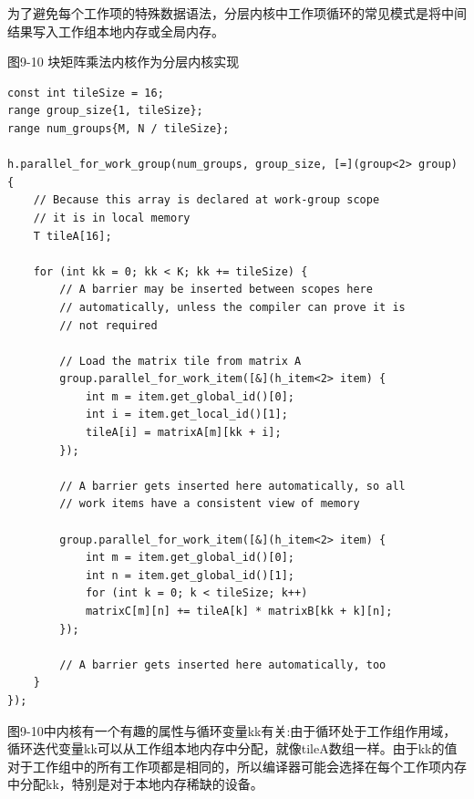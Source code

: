 为了避免每个工作项的特殊数据语法，分层内核中工作项循环的常见模式是将中间结果写入工作组本地内存或全局内存。\par

\hspace*{\fill} \par %
图9-10 块矩阵乘法内核作为分层内核实现
\begin{lstlisting}[caption={}]
const int tileSize = 16;
range group_size{1, tileSize};
range num_groups{M, N / tileSize};

h.parallel_for_work_group(num_groups, group_size, [=](group<2> group) {
	// Because this array is declared at work-group scope
	// it is in local memory
	T tileA[16];
	
	for (int kk = 0; kk < K; kk += tileSize) {
		// A barrier may be inserted between scopes here
		// automatically, unless the compiler can prove it is
		// not required
		
		// Load the matrix tile from matrix A
		group.parallel_for_work_item([&](h_item<2> item) {
			int m = item.get_global_id()[0];
			int i = item.get_local_id()[1];
			tileA[i] = matrixA[m][kk + i];
		});
	
		// A barrier gets inserted here automatically, so all
		// work items have a consistent view of memory
		
		group.parallel_for_work_item([&](h_item<2> item) {
			int m = item.get_global_id()[0];
			int n = item.get_global_id()[1];
			for (int k = 0; k < tileSize; k++)
			matrixC[m][n] += tileA[k] * matrixB[kk + k][n];
		});
	
		// A barrier gets inserted here automatically, too
	}
});
\end{lstlisting}

图9-10中内核有一个有趣的属性与循环变量kk有关:由于循环处于工作组作用域，循环迭代变量kk可以从工作组本地内存中分配，就像tileA数组一样。由于kk的值对于工作组中的所有工作项都是相同的，所以编译器可能会选择在每个工作项内存中分配kk，特别是对于本地内存稀缺的设备。\par























